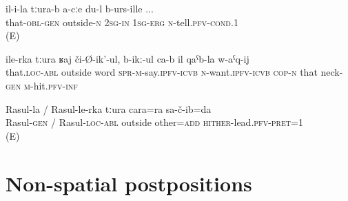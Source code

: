 \begin{exe}
	\ex
	\begin{xlist}
		\ex	\label{If I can tell you now (something else) apart from this}
		\gll	il-i-la	tːura-b	a-cːe	du-l	b-urs-ille  ...\\
			that-\textsc{obl}-\textsc{gen}	outside-\textsc{n}	2\textsc{sg}-\textsc{in}	1\textsc{sg}-\textsc{erg}	\textsc{n}-tell.\textsc{pfv}-\textsc{cond}.1\\
		\glt	{} (E)

		\ex	\label{Moreover, he defamed (him) and wanted (him) to be beheaded}
		\gll	ile-rka tːura		ʁaj	či-Ø-ik'-ul,	b-ikː-ul ca-b	il	qaˁb-la	w-aˁq-ij\\
			that.\textsc{loc}-\textsc{abl}	outside	word	\textsc{spr}-\textsc{m}-say.\textsc{ipfv}-\textsc{icvb}	\textsc{n}-want.\textsc{ipfv}-\textsc{icvb} \textsc{cop-n}	that	neck-\textsc{gen}	\textsc{m}-hit.\textsc{pfv}-\textsc{inf}\\
		\glt	{}

		\ex	\label{Apart from Rasul I also brought another one}
		\gll	Rasul-la	/	Rasul-le-rka	tːura	cara=ra	sa-č-ib=da  \\
			Rasul-\textsc{gen}	/ Rasul-\textsc{loc}-\textsc{abl}	outside	other=\textsc{add}	\textsc{hither}-lead.\textsc{pfv}-\textsc{pret}=1\\
		\glt	{} (E)
	\end{xlist}
\end{exe}



\section{Non-spatial postpositions}
\label{sec:Non-spatial postpositions}



\subsection{ }
\label{ssec:postposition balli}

